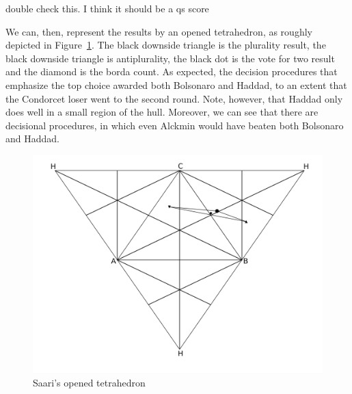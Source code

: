 \documentclass[hidelinks,11pt]{article}
\begin{document}
\Big{\textcolor{red}{TODO}} double check this. I think it should be a qs score


We can, then, represent the results by an opened tetrahedron, as roughly
depicted in Figure~\ref{fig:ot}. The black downside triangle is the plurality
result, the black downside triangle is antiplurality, the black dot is the vote
for two result and the diamond is the borda count. As expected, the decision
procedures that emphasize the top choice awarded both Bolsonaro and Haddad, to
an extent that the Condorcet loser went to the second round. Note, however, that
Haddad only does well in a small region of the hull. Moreover, we can see that
there are decisional procedures, in which even Alckmin would have beaten both
Bolsonaro and Haddad.

\begin{figure}[H]
 \centering
 \includegraphics[width=0.8\columnwidth,
 height=0.3\textheight]{./images/opened_tetrahedron1.png}
 \caption{Saari's opened tetrahedron }
 \label{fig:ot}
\end{figure}
\end{document}
